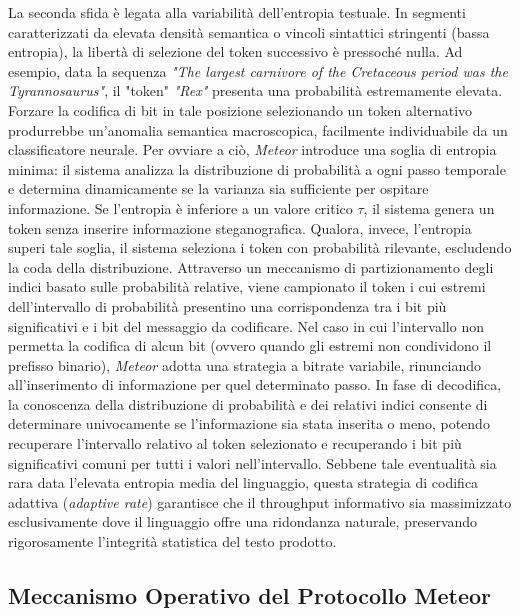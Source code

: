 La seconda sfida è legata alla variabilità dell'entropia testuale. In segmenti caratterizzati da elevata densità semantica o vincoli sintattici stringenti (bassa entropia), la libertà di selezione del token successivo è pressoché nulla. Ad esempio, data la sequenza \emph{"The largest carnivore of the Cretaceous period was the Tyrannosaurus"}, il "token" \emph{"Rex"} presenta una probabilità estremamente elevata. Forzare la codifica di bit in tale posizione selezionando un token alternativo produrrebbe un'anomalia semantica macroscopica, facilmente individuabile da un classificatore neurale. Per ovviare a ciò, \emph{Meteor} introduce una soglia di entropia minima: il sistema analizza la distribuzione di probabilità a ogni passo temporale e determina dinamicamente se la varianza sia sufficiente per ospitare informazione. Se l'entropia è inferiore a un valore critico $\tau$, il sistema genera un token senza inserire informazione steganografica. Qualora, invece, l'entropia superi tale soglia, il sistema seleziona i token con probabilità rilevante, escludendo la coda della distribuzione. Attraverso un meccanismo di partizionamento degli indici basato sulle probabilità relative, viene campionato il token i cui estremi dell'intervallo di probabilità presentino una corrispondenza tra i bit più significativi e i bit del messaggio da codificare. Nel caso in cui l'intervallo non permetta la codifica di alcun bit (ovvero quando gli estremi non condividono il prefisso binario), \emph{Meteor} adotta una strategia a bitrate variabile, rinunciando all'inserimento di informazione per quel determinato passo. In fase di decodifica, la conoscenza della distribuzione di probabilità e dei relativi indici consente di determinare univocamente se l'informazione sia stata inserita o meno, potendo recuperare l'intervallo relativo al token selezionato e recuperando i bit più significativi comuni per tutti i valori nell'intervallo. Sebbene tale eventualità sia rara data l'elevata entropia media del linguaggio, questa strategia di codifica adattiva (\emph{adaptive rate}) garantisce che il throughput informativo sia massimizzato esclusivamente dove il linguaggio offre una ridondanza naturale, preservando rigorosamente l'integrità statistica del testo prodotto.

\subsection{Meccanismo Operativo del Protocollo Meteor}
\label{subsec:meteor-meccanismo}

